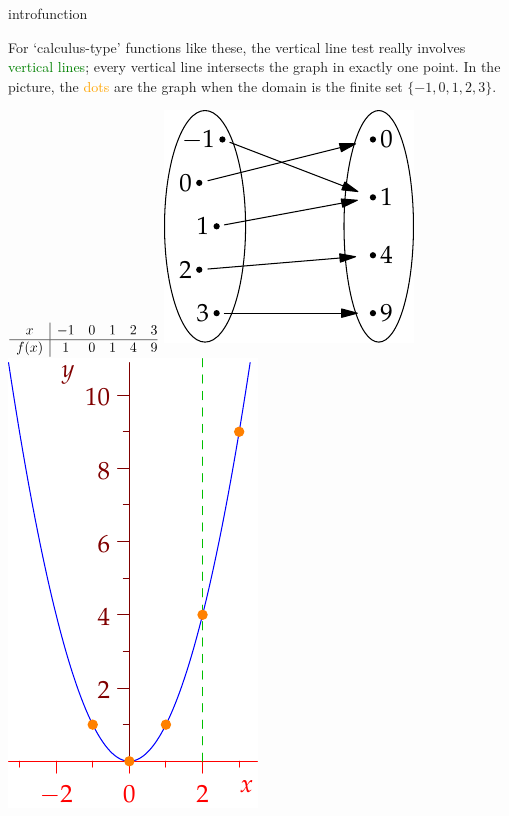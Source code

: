 \begin{example}{}{introfunction}
\begin{description}
\begin{minipage}[t]{0.7\linewidth}
	For `calculus-type' functions like these, the vertical line test really involves \textcolor{Green}{vertical lines}; every vertical line intersects the graph in exactly one point.\smallbreak
	In the picture, the \textcolor{orange}{dots} are the graph when the domain is the finite set $\{-1,0,1,2,3\}$.
  \end{minipage}\hfill\begin{minipage}[t]{0.29\linewidth}\vspace{0pt}
  	\flushright$\begin{array}{c|ccccc@{}}
	x&-1&0&1&2&3\\\hline
	f(x)&1&0&1&4&9
	\end{array}$\bigbreak
	\includegraphics[scale=0.95]{functions-quad2}\bigbreak
	\includegraphics[scale=0.95]{functions-quad}
  \end{minipage}
\end{description}
\end{example}

